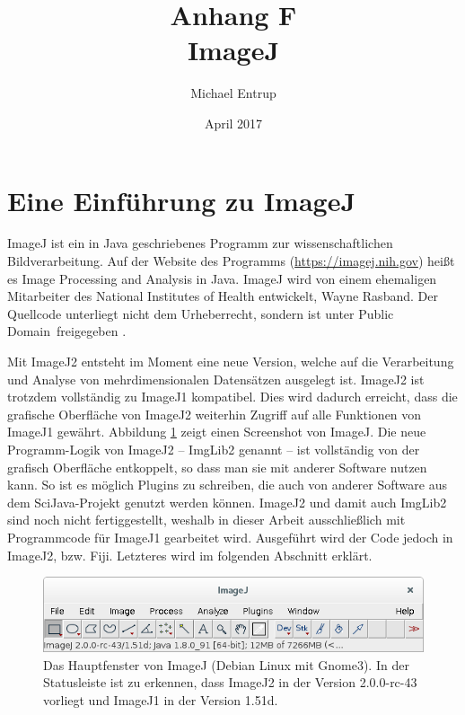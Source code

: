 \documentclass[
	paper=a4,				%
	twoside=true,			%
	BCOR=6mm,				%
	fontsize=12pt,			%
	pagesize=auto,			%
	numbers=noenddot,		%
	bibliography=totoc,		%
	draft=false
]{scrartcl}
\begin{document}
	

\author{Michael Entrup}
\title{Anhang F \\ ImageJ}
\date{April 2017}

\maketitle

\tableofcontents

\section{Eine Einführung zu ImageJ}

ImageJ ist ein in Java geschriebenes Programm zur wissenschaftlichen Bildverarbeitung. Auf der Website des Programms (\url{https://imagej.nih.gov}) heißt es \glqq Image Processing and Analysis in Java\grqq. ImageJ wird von einem ehemaligen Mitarbeiter des National Institutes of Health entwickelt, Wayne Rasband. Der Quellcode unterliegt nicht dem Urheberrecht, sondern ist unter \glqq Public Domain\grqq\  freigegeben \cite{rasband_imagej_2004}.

Mit ImageJ2 entsteht im Moment eine neue Version, welche auf die Verarbeitung und Analyse von mehrdimensionalen Datensätzen ausgelegt ist. ImageJ2 ist trotzdem vollständig zu ImageJ1 kompatibel. Dies wird dadurch erreicht, dass die grafische Oberfläche von ImageJ2 weiterhin Zugriff auf alle Funktionen von ImageJ1 gewährt. Abbildung \ref{fig:ImageJ_main} zeigt einen Screenshot von ImageJ. Die neue Programm-Logik von ImageJ2 -- ImgLib2 genannt -- ist vollständig von der grafisch Oberfläche entkoppelt, so dass man sie mit anderer Software nutzen kann. So ist es möglich Plugins zu schreiben, die auch von anderer Software aus dem SciJava-Projekt genutzt werden können. ImageJ2 und damit auch ImgLib2 sind noch nicht fertiggestellt, weshalb in dieser Arbeit ausschließlich mit Programmcode für ImageJ1 gearbeitet wird. Ausgeführt wird der Code jedoch in ImageJ2, bzw. Fiji. Letzteres wird im folgenden Abschnitt erklärt.

\begin{figure}
	\centering
	\includegraphics[width=1\linewidth]{Bilder/ImageJ_main}
	\caption{Das Hauptfenster von ImageJ (Debian Linux mit Gnome3). In der Statusleiste ist zu erkennen, dass ImageJ2 in der Version 2.0.0-rc-43 vorliegt und ImageJ1 in der Version 1.51d.}
	\label{fig:ImageJ_main}
\end{figure}
\end{document}
